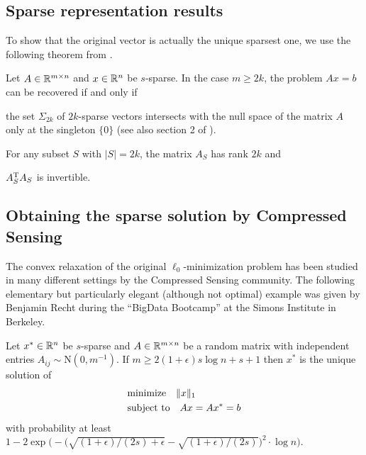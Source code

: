 \documentclass{article} %
\begin{document}
\subsection{Sparse representation results}
To show that the original vector is actually the unique sparsest one, we use the following theorem from \cite{Dahmen_CS}.
\begin{theorem}
\label{thm:l0unique}
Let $A \in \mathbb{R}^{m\times n}$ and $x\in\mathbb{R}^n$ be $s$-sparse. In the case
$m\geq 2k$, the problem $Ax = b$ can be recovered if and only if
\begin{inparaenum}[(a)]
\item the set $\Sigma_{2k}$ of $2k$-sparse vectors intersects with the null space of the matrix $A$ only at the singleton $\{0\}$ (see also section 2 of \cite{Dahmen_CS}).
\item For any subset $S$ with $|S| = 2k$, the matrix $A_S$ has rank $2k$ and
\item $A_S^{\rm T} A_S$ is invertible.
\end{inparaenum}
\end{theorem}

\subsection{Obtaining the sparse solution by Compressed Sensing}
The convex relaxation of the original $\ell_0$-minimization problem
has been studied in many different settings by the Compressed Sensing
community.
The following elementary but particularly elegant (although not optimal) example was given by Benjamin Recht during the ``BigData Bootcamp'' at the Simons Institute in Berkeley.
\begin{theorem}
  Let $x^*\in \mathbb{R}^n$ be $s$-sparse and $A \in \mathbb{R}^{m\times n}$ be a
  random matrix with independent entries $A_{ij}\sim \text{N}(0,
  m^{-1})$. If $m \geq 2 (1+\epsilon) s\log n + s + 1$ then $x^*$ is
  the unique solution of
  \begin{align}
    &\text{minimize}\quad \lVert x\rVert_1\label{CS}\\
    &\text{subject to}\quad Ax = Ax^* = b \nonumber
  \end{align}
  with probability at least $1 - 2\exp\bigl(-\bigl(\sqrt{(1+\epsilon)/(2s) +
      \epsilon} - \sqrt{(1+\epsilon)/(2s)}\bigr)^2\cdot \log n\bigr).$
\end{theorem}
\end{document}
